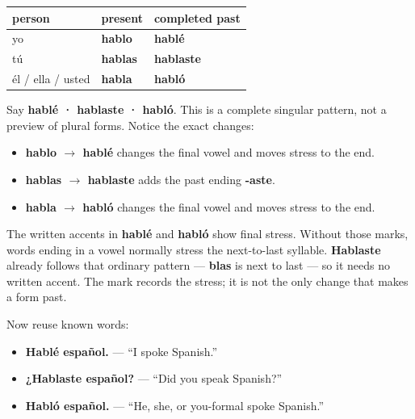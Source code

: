 \begin{grammarlens}[title={Grammar Lens: present beside completed past}]
\noindent
\begin{tabularx}{\linewidth}{@{}>{\raggedright\arraybackslash}X>{\raggedright\arraybackslash}X>{\raggedright\arraybackslash}X@{}}
\toprule
\textbf{person} & \textbf{present} & \textbf{completed past} \\
\midrule
yo & \textbf{hablo} & \textbf{hablé} \\
tú & \textbf{hablas} & \textbf{hablaste} \\
él / ella / usted & \textbf{habla} & \textbf{habló} \\
\bottomrule
\end{tabularx}

Say \textbf{hablé · hablaste · habló}. This is a complete singular pattern, not a preview of plural forms. Notice the exact changes:

\begin{itemize}
\raggedright
  \item \textbf{hablo $\to$ hablé} changes the final vowel and moves stress to the end.
  \item \textbf{hablas $\to$ hablaste} adds the past ending \textbf{-aste}.
  \item \textbf{habla $\to$ habló} changes the final vowel and moves stress to the end.
\end{itemize}
\end{grammarlens}

\begin{grammarlens}[title={Grammar Lens: two accents, one natural stress pattern}]
The written accents in \textbf{hablé} and \textbf{habló} show final stress. Without those marks, words ending in a vowel normally stress the next-to-last syllable. \textbf{Hablaste} already follows that ordinary pattern — \textbf{blas} is next to last — so it needs no written accent. The mark records the stress; it is not the only change that makes a form past.

Now reuse known words:

\begin{itemize}
\raggedright
  \item \textbf{Hablé español.} — “I spoke Spanish.”
  \item \textbf{¿Hablaste español?} — “Did you speak Spanish?”
  \item \textbf{Habló español.} — “He, she, or you-formal spoke Spanish.”
\end{itemize}
\end{grammarlens}


